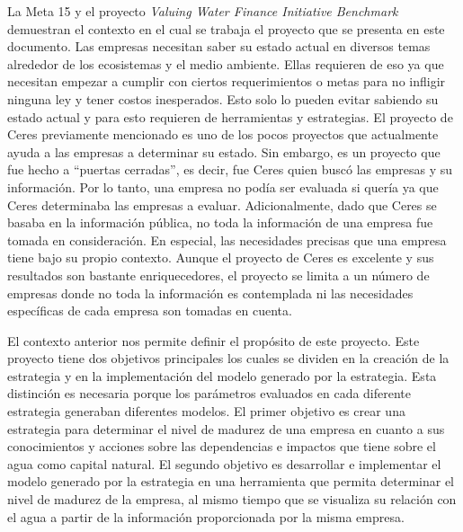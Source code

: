 La Meta 15 y el proyecto \textit{Valuing Water Finance Initiative Benchmark} demuestran el contexto en el cual se trabaja el proyecto que se presenta en este documento. Las empresas necesitan saber su estado actual en diversos temas alrededor de los ecosistemas y el medio ambiente. Ellas requieren de eso ya que necesitan empezar a cumplir con ciertos requerimientos o metas para no infligir ninguna ley y tener costos inesperados. Esto solo lo pueden evitar sabiendo su estado actual y para esto requieren de herramientas y estrategias. El proyecto de Ceres previamente mencionado es uno de los pocos proyectos que actualmente ayuda a las empresas a determinar su estado. Sin embargo, es un proyecto que fue hecho a “puertas cerradas”, es decir, fue Ceres quien buscó las empresas y su información. Por lo tanto, una empresa no podía ser evaluada si quería ya que Ceres determinaba las empresas a evaluar. Adicionalmente, dado que Ceres se basaba en la información pública, no toda la información de una empresa fue tomada en consideración. En especial, las necesidades precisas que una empresa tiene bajo su propio contexto. Aunque el proyecto de Ceres es excelente y sus resultados son bastante enriquecedores, el proyecto se limita a un número de empresas donde no toda la información es contemplada ni las necesidades específicas de cada empresa son tomadas en cuenta. 

\hfill

El contexto anterior nos permite definir el propósito de este proyecto. Este proyecto tiene dos objetivos principales los cuales se dividen en la creación de la estrategia y en la implementación del modelo generado por la estrategia. Esta distinción es necesaria porque los parámetros evaluados en cada diferente estrategia generaban diferentes modelos. El primer objetivo es crear una estrategia para determinar el nivel de madurez de una empresa en cuanto a sus conocimientos y acciones sobre las dependencias e impactos que tiene sobre el agua como capital natural. El segundo objetivo es desarrollar e implementar el modelo generado por la estrategia en una herramienta que permita determinar el nivel de madurez de la empresa, al mismo tiempo que se visualiza su relación con el agua a partir de la información proporcionada por la misma empresa. 

